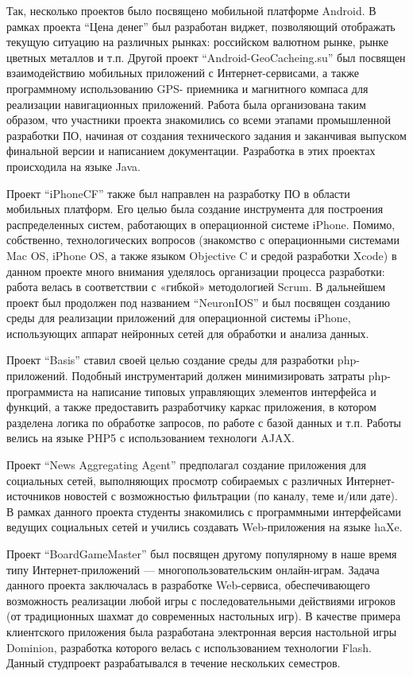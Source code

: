 \documentclass[a5paper]{article}
\begin{document}
Так, несколько проектов было посвящено мобильной платформе Android. В рамках проекта ``Цена денег'' был разработан виджет, позволяющий отображать текущую ситуацию на различных рынках: российском валютном рынке, рынке цветных металлов и т.п. Другой проект ``Android-GeoCacheing.su'' был посвящен взаимодействию мобильных приложений с Интернет-сервисами, а также программному использованию GPS- приемника и магнитного компаса для реализации навигационных приложений. Работа была организована таким образом, что участники проекта знакомились со всеми этапами промышленной разработки ПО, начиная от создания технического задания и заканчивая выпуском финальной версии и написанием документации. Разработка в этих проектах происходила на языке Java. 

Проект ``iPhoneCF'' также был направлен на разработку ПО в области мобильных платформ. Его целью была создание инструмента для построения распределенных систем, работающих в операционной системе iPhone. Помимо, собственно, технологических вопросов (знакомство с операционными системами Mac OS, iPhone OS, а также языком Objective C и средой разработки Xcode) в данном проекте много внимания уделялось организации процесса разработки: работа велась в соответствии с «гибкой» методологией Scrum. В дальнейшем проект был продолжен под названием ``NeuronIOS'' и был посвящен созданию среды для реализации приложений для операционной системы iPhone, использующих аппарат нейронных сетей для обработки и анализа данных.

Проект ``Basis'' ставил своей целью создание среды для разработки php-приложений. Подобный инструментарий должен минимизировать затраты php-программиста на написание типовых управляющих элементов интерфейса и функций, а также предоставить разработчику каркас приложения, в котором разделена логика по обработке запросов, по работе с базой данных и т.п. Работы велись на языке PHP5 с использованием технологи AJAX.

Проект ``News Aggregating Agent'' предполагал создание приложения для социальных сетей, выполняющих просмотр собираемых с различных Интернет-источников новостей с возможностью фильтрации (по каналу, теме и/или дате). В рамках данного проекта студенты знакомились с программными интерфейсами ведущих социальных сетей и учились создавать Web-приложения на языке haXe.

Проект ``BoardGameMaster'' был посвящен другому популярному в наше время типу Интернет-приложений — многопользовательским онлайн-играм. Задача данного проекта заключалась в разработке Web-сервиса, обеспечивающего возможность реализации любой игры с последовательными действиями игроков (от традиционных шахмат до современных настольных игр). В качестве примера клиентского приложения была разработана электронная версия настольной игры Dominion, разработка которого велась с использованием технологии Flash. Данный студпроект разрабатывался  в течение нескольких семестров.
\end{document}
